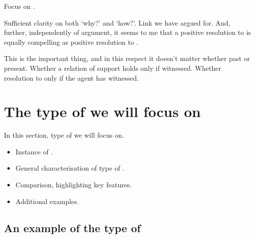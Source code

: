\begin{note}
  Focus on \issueConstraint{}.
  \vspace{-\baselineskip}
  \begin{quote}
    \rIssueConstraint*
  \end{quote}
  Sufficient clarity on both `why?' and `how?'.
  Link we have argued for.
  And, further, independently of argument, it seems to me that a positive resolution to \issueConstraint{} is equally compelling as positive resolution to \issueInclusion{}.
\end{note}

\begin{note}
  This is the important thing, and in this respect it doesn't matter whether past or present.
  Whether a relation of support holds only if witnessed.
  Whether resolution to \qWhy{} only if the agent has witnessed.
\end{note}

\section{The type of  we will focus on}
\label{sec:clar:type-of-scen}

\begin{note}
  In this section, type of  we will focus on.
  \begin{itemize}
  \item
    Instance of .
  \item
    General characterisation of type of .
  \item
    Comparison, highlighting key features.
  \item
    Additional examples.
  \end{itemize}
\end{note}

\subsection{An example of the type of }

